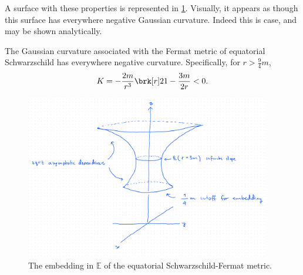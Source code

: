 %
A surface with these properties is represented in \ref{fig:embedding}.
Visually, it appears as though this surface has everywhere negative Gaussian curvature. Indeed this is case, and may be shown analytically.
\begin{proposition}[]\label{}
The Gaussian curvature associated with the Fermat metric of equatorial Schwarzschild has everywhere negative curvature. Specifically, for $r > \frac{9}{4}m$,
\begin{equation}\label{}
K = - \frac{2m}{r^3}\brk[r]2{1 - \frac{3m}{2r}} < 0.
\end{equation}
\end{proposition}
%
\begin{figure}[!htb]
	\centering
	\includegraphics[width=0.95\textwidth]{img/embedding.png}
	\caption{The embedding in $\mathbb{E}$ of the equatorial Schwarzschild-Fermat metric.}
	\label{fig:embedding}
\end{figure}

